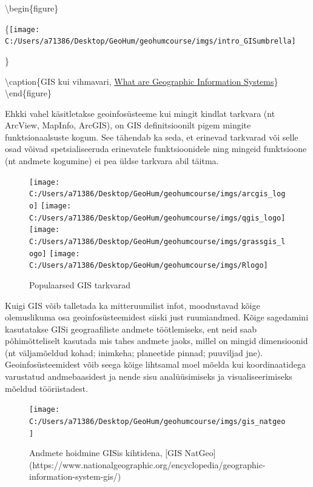 \documentclass[
]{book}
\begin{document}
\textbackslash begin\{figure\}

\{\centering \texttt{[image: C:/Users/a71386/Desktop/GeoHum/geohumcourse/imgs/intro\_GISumbrella]}

\}

\textbackslash caption\{GIS kui vihmavari, \href{http://spatialquerylab.com/FOSS4GAcademy/Lectures/GST101/L1/1-What_are_Geographic_Information_Systems.pdf}{What are Geographic Information Systems}\}\label{fig:gis-umbrella}
\textbackslash end\{figure\}

Ehkki vahel käsitletakse geoinfosüsteeme kui mingit kindlat tarkvara (nt ArcView, MapInfo, ArcGIS), on GIS definitsioonilt pigem mingite funktsionaalsuste kogum. See tähendab ka seda, et erinevad tarkvarad või selle osad võivad spetsialiseeruda erinevatele funktsioonidele ning mingeid funktsioone (nt andmete kogumine) ei pea üldse tarkvara abil täitma.

\begin{figure}

{\centering \texttt{[image: C:/Users/a71386/Desktop/GeoHum/geohumcourse/imgs/arcgis\_logo]} \texttt{[image: C:/Users/a71386/Desktop/GeoHum/geohumcourse/imgs/qgis\_logo]} \texttt{[image: C:/Users/a71386/Desktop/GeoHum/geohumcourse/imgs/grassgis\_logo]} \texttt{[image: C:/Users/a71386/Desktop/GeoHum/geohumcourse/imgs/Rlogo]} 

}

\caption{Populaarsed GIS tarkvarad}\label{fig:gis-tarkvarad}
\end{figure}

Kuigi GIS võib talletada ka mitteruumilist infot, moodustavad kõige olemuslikuma osa geoinfosüsteemidest siiski just ruumiandmed. Kõige sagedamini kasutatakse GISi geograafiliste andmete töötlemiseks, ent neid saab põhimõtteliselt kasutada mis tahes andmete jaoks, millel on mingid dimensioonid (nt väljamõeldud kohad; inimkeha; planeetide pinnad; puuviljad jne). Geoinfosüsteemidest võib seega kõige lihtsamal moel mõelda kui koordinaatidega varustatud andmebaasidest ja nende sisu analüüsimiseks ja visualiseerimiseks mõeldud tööriistadest.

\begin{figure}

{\centering \texttt{[image: C:/Users/a71386/Desktop/GeoHum/geohumcourse/imgs/gis\_natgeo]} 

}

\caption{Andmete hoidmine GISis kihtidena, [GIS NatGeo](https://www.nationalgeographic.org/encyclopedia/geographic-information-system-gis/)}\label{fig:kihid}
\end{figure}
\end{document}
